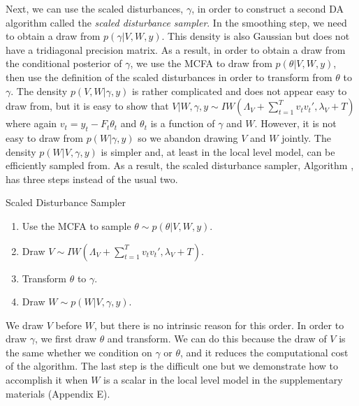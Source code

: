 \documentclass[12pt]{article}
\begin{document}
Next, we can use the scaled disturbances, $\gamma$, in order to construct a second DA algorithm called the {\it scaled disturbance sampler}. In the smoothing step, we need to obtain a draw from $p(\gamma|V,W,y)$. This density is also Gaussian but does not have a tridiagonal precision matrix. As a result, in order to obtain a draw from the conditional posterior of $\gamma$, we use the MCFA to draw from $p(\theta|V,W,y)$, then use the definition of the scaled disturbances in order to transform from $\theta$ to $\gamma$. The density $p(V,W|\gamma,y)$ is rather complicated and does not appear easy to draw from, but it is easy to show that $V|W,\gamma,y \sim IW\left(\Lambda_V + \sum_{t=1}^Tv_tv_t',\lambda_V + T\right)$ where again $v_t = y_t - F_t\theta_t$ and $\theta_t$ is a function of $\gamma$ and $W$. However, it is not easy to draw from $p(W|\gamma,y)$ so we abandon drawing $V$ and $W$ jointly. The density $p(W|V,\gamma,y)$ is simpler and, at least in the local level model, can be efficiently sampled from. As a result, the scaled disturbance sampler, Algorithm , has three steps instead of the usual two. 
\begin{alg*}[SD]Scaled Disturbance Sampler\label{alg:DLMdist}
\begin{enumerate}
\item Use the MCFA to sample $\theta \sim p(\theta|V,W,y)$.
\item Draw $V \sim IW\left(\Lambda_V + \sum_{t=1}^Tv_tv_t',\lambda_V + T\right)$.
\item Transform $\theta$ to $\gamma$.
\item Draw $W \sim p(W|V,\gamma,y)$.
\end{enumerate}
\end{alg*}\noindent
We draw $V$ before $W$, but there is no intrinsic reason for this order. In order to draw $\gamma$, we first draw $\theta$ and transform. We can do this because the draw of $V$ is the same whether we condition on $\gamma$ or $\theta$, and it reduces the computational cost of the algorithm. The last step is the difficult one but we demonstrate how to accomplish it when $W$ is a scalar in the local level model in the supplementary materials (Appendix E).
\end{document}
